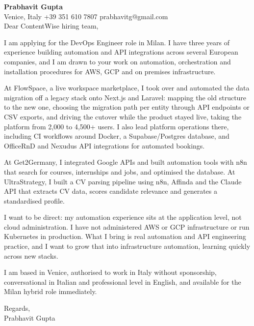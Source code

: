 \documentclass[a4paper,10.5pt]{article}
\begin{document}
\textbf{Prabhavit Gupta}\\
Venice, Italy \textbar{} +39 351 610 7807 \textbar{} prabhavitg@gmail.com\\[10pt]
Dear ContentWise hiring team,

I am applying for the DevOps Engineer role in Milan. I have three years of experience building automation and API integrations across several European companies, and I am drawn to your work on automation, orchestration and installation procedures for AWS, GCP and on premises infrastructure.

At FlowSpace, a live workspace marketplace, I took over and automated the data migration off a legacy stack onto Next.js and Laravel: mapping the old structure to the new one, choosing the migration path per entity through API endpoints or CSV exports, and driving the cutover while the product stayed live, taking the platform from 2,000 to 4,500+ users. I also lead platform operations there, including CI workflows around Docker, a Supabase/Postgres database, and OfficeRnD and Nexudus API integrations for automated bookings.

At Get2Germany, I integrated Google APIs and built automation tools with n8n that search for courses, internships and jobs, and optimised the database. At UltraStrategy, I built a CV parsing pipeline using n8n, Affinda and the Claude API that extracts CV data, scores candidate relevance and generates a standardised profile.

I want to be direct: my automation experience sits at the application level, not cloud administration. I have not administered AWS or GCP infrastructure or run Kubernetes in production. What I bring is real automation and API engineering practice, and I want to grow that into infrastructure automation, learning quickly across new stacks.

I am based in Venice, authorised to work in Italy without sponsorship, conversational in Italian and professional level in English, and available for the Milan hybrid role immediately.

Regards,\\
Prabhavit Gupta
\end{document}
